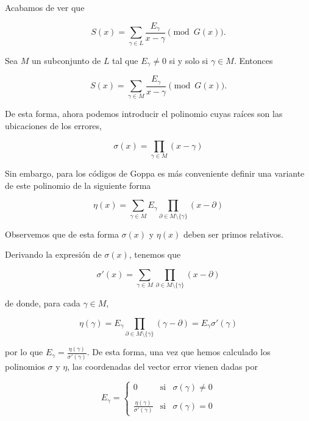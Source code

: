 Acabamos de ver que 

$$S(x) = \sum_{\gamma \in L} \frac{E_\gamma}{x - \gamma} \pmod{G(x)}.$$

Sea $M$ un subconjunto de $L$ tal que $E_{\gamma} \neq 0$ si y solo si $\gamma \in M$. Entonces

\begin{equation}
    \label{def:sindrome}
    S(x) = \sum_{\gamma \in M} \frac{E_\gamma}{x - \gamma} \pmod{G(x)}.
\end{equation}

De esta forma, ahora podemos introducir el polinomio cuyas raíces son las ubicaciones de los errores,

\begin{equation}
    \label{def:localizaciones}
    \sigma (x) = \prod_{\gamma \in M} (x - \gamma)
\end{equation}

Sin embargo, para los códigos de Goppa es más conveniente definir una variante de este polinomio de la siguiente forma

\begin{equation}
    \label{def:eta}
    \eta (x) = \sum_{\gamma \in M} E_\gamma \prod_{\partial \in M \setminus \{ \gamma \} } (x - \partial)
\end{equation}

Observemos que de esta forma $\sigma(x)$ y $\eta(x)$ deben ser primos relativos.

Derivando la expresión de $\sigma(x)$, tenemos que 

\begin{equation}
    \label{def:localizaciones_derivada}
    \sigma'(x) = \sum_{\gamma \in M} \prod_{\partial \in M \setminus \{ \gamma \} } (x - \partial)
\end{equation}


de donde, para cada $\gamma \in M$,

$$\eta (\gamma) = E_\gamma \prod_{\partial \in M \setminus \{ \gamma \} } (\gamma - \partial) = E_\gamma \sigma'(\gamma)$$

por lo que $E_\gamma = \frac{\eta(\gamma)}{\sigma'(\gamma)}$. De esta forma, una vez que hemos calculado los polinomios $\sigma$ y $\eta$, las coordenadas del vector error vienen dadas por 

\[
    E_\gamma = \left\{ \begin{array}{lcc}
    0 &   \text{si}  & \sigma(\gamma) \neq 0 \\
    \\ \frac{\eta(\gamma)}{\sigma'(\gamma)} &  \text{si} & \sigma(\gamma) = 0
    \end{array}
    \right.
\]

